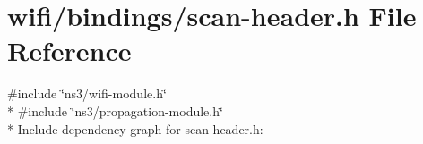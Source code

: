 \hypertarget{wifi_2bindings_2scan-header_8h}{}\section{wifi/bindings/scan-\/header.h File Reference}
\label{wifi_2bindings_2scan-header_8h}
{\ttfamily \#include \char`\"{}ns3/wifi-\/module.\+h\char`\"{}}\\*
{\ttfamily \#include \char`\"{}ns3/propagation-\/module.\+h\char`\"{}}\\*
Include dependency graph for scan-\/header.h\+:
